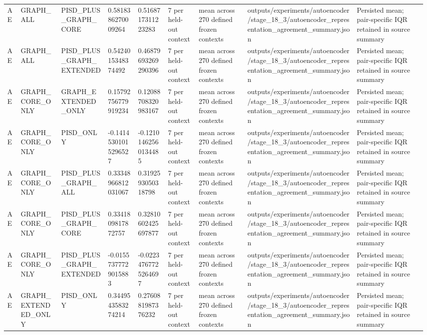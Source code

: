 \begin{longtable}{lllllllll}
AE & GRAPH\_ALL & PISD\_PLUS\_GRAPH\_CORE & 0.5818386270009264 & 0.5168717311223283 & 7 per held-out context & mean across 270 defined frozen contexts & outputs/experiments/autoencoder/stage\_18\_3/autoencoder\_representation\_agreement\_summary.json & Persisted mean; pair-specific IQR retained in source summary \\
AE & GRAPH\_ALL & PISD\_PLUS\_GRAPH\_EXTENDED & 0.5424015348374492 & 0.46879693269290396 & 7 per held-out context & mean across 270 defined frozen contexts & outputs/experiments/autoencoder/stage\_18\_3/autoencoder\_representation\_agreement\_summary.json & Persisted mean; pair-specific IQR retained in source summary \\
AE & GRAPH\_CORE\_ONLY & GRAPH\_EXTENDED\_ONLY & 0.15792756779919234 & 0.12088708320983167 & 7 per held-out context & mean across 270 defined frozen contexts & outputs/experiments/autoencoder/stage\_18\_3/autoencoder\_representation\_agreement\_summary.json & Persisted mean; pair-specific IQR retained in source summary \\
AE & GRAPH\_CORE\_ONLY & PISD\_ONLY & -0.14145301015296527 & -0.12101462560134485 & 7 per held-out context & mean across 270 defined frozen contexts & outputs/experiments/autoencoder/stage\_18\_3/autoencoder\_representation\_agreement\_summary.json & Persisted mean; pair-specific IQR retained in source summary \\
AE & GRAPH\_CORE\_ONLY & PISD\_PLUS\_GRAPH\_ALL & 0.33348966812031067 & 0.3192593050318798 & 7 per held-out context & mean across 270 defined frozen contexts & outputs/experiments/autoencoder/stage\_18\_3/autoencoder\_representation\_agreement\_summary.json & Persisted mean; pair-specific IQR retained in source summary \\
AE & GRAPH\_CORE\_ONLY & PISD\_PLUS\_GRAPH\_CORE & 0.3341809817872757 & 0.32810602425697877 & 7 per held-out context & mean across 270 defined frozen contexts & outputs/experiments/autoencoder/stage\_18\_3/autoencoder\_representation\_agreement\_summary.json & Persisted mean; pair-specific IQR retained in source summary \\
AE & GRAPH\_CORE\_ONLY & PISD\_PLUS\_GRAPH\_EXTENDED & -0.01557377729015883 & -0.02234767725264697 & 7 per held-out context & mean across 270 defined frozen contexts & outputs/experiments/autoencoder/stage\_18\_3/autoencoder\_representation\_agreement\_summary.json & Persisted mean; pair-specific IQR retained in source summary \\
AE & GRAPH\_EXTENDED\_ONLY & PISD\_ONLY & 0.3449543583274214 & 0.2760881987376232 & 7 per held-out context & mean across 270 defined frozen contexts & outputs/experiments/autoencoder/stage\_18\_3/autoencoder\_representation\_agreement\_summary.json & Persisted mean; pair-specific IQR retained in source summary \\

\end{longtable}

